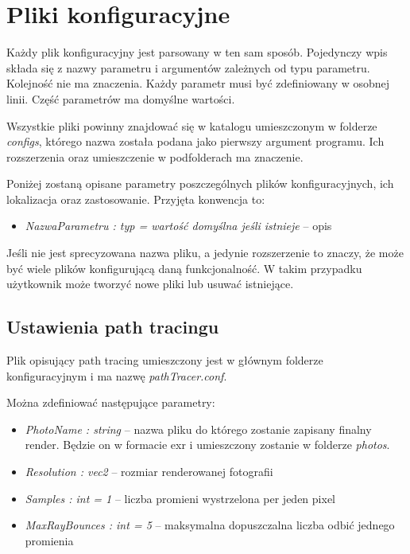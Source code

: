 \documentclass[inz,longabstract]{iithesis}
\begin{document}
    \section{Pliki konfiguracyjne}
        Każdy plik konfiguracyjny jest parsowany w ten sam sposób. Pojedynczy wpis składa się z nazwy parametru i argumentów zależnych od typu parametru. Kolejność nie ma znaczenia. Każdy parametr musi być zdefiniowany w osobnej linii. Część parametrów ma domyślne wartości. 
        
        Wszystkie pliki powinny znajdować się w katalogu umieszczonym w folderze \textit{configs}, którego nazwa została podana jako pierwszy argument programu. Ich rozszerzenia oraz umieszczenie w podfolderach ma znaczenie.
        
        Poniżej zostaną opisane parametry poszczególnych plików konfiguracyjnych, ich lokalizacja oraz zastosowanie. Przyjęta konwencja to:
        \begin{itemize}
            \item \textit{NazwaParametru : typ = wartość domyślna jeśli istnieje} -- opis
        \end{itemize}
        
        Jeśli nie jest sprecyzowana nazwa pliku, a jedynie rozszerzenie to znaczy, że może być wiele plików konfigurującą daną funkcjonalność. W takim przypadku użytkownik może tworzyć nowe pliki lub usuwać istniejące.
        
        \subsection{Ustawienia path tracingu}
        Plik opisujący path tracing umieszczony jest w głównym folderze konfiguracyjnym i ma nazwę \textit{pathTracer.conf}.
        
        Można zdefiniować następujące parametry:
        \begin{itemize}
            \item \textit{PhotoName : string} -- nazwa pliku do którego zostanie zapisany finalny render. Będzie on w formacie exr i umieszczony zostanie w folderze \textit{photos}.
            \item \textit{Resolution : vec2} -- rozmiar renderowanej fotografii
            \item \textit{Samples : int = 1} -- liczba promieni wystrzelona per jeden pixel
            \item \textit{MaxRayBounces : int = 5} -- maksymalna dopuszczalna liczba odbić jednego promienia  
        \end{itemize}
\end{document}
